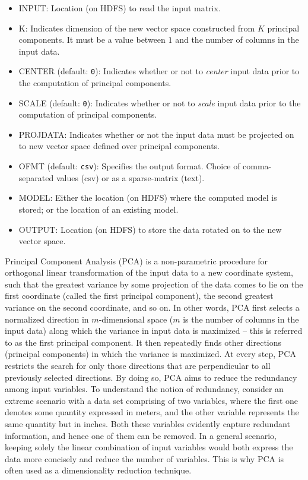 
\begin{itemize}
\item INPUT: Location (on HDFS) to read the input matrix.
\item K: Indicates dimension of the new vector space constructed from $K$ principal components. It must be a value between $1$ and the number of columns in the input data.
\item CENTER (default: {\tt 0}): Indicates whether or not to {\em center} input data prior to the computation of principal components.
\item SCALE (default: {\tt 0}): Indicates whether or not to {\em scale} input data prior to the computation of principal components.
\item PROJDATA: Indicates whether or not the input data must be projected on to new vector space defined over principal components.
\item OFMT (default: {\tt csv}): Specifies the output format. Choice of comma-separated values (csv) or as a sparse-matrix (text).
\item MODEL: Either the location (on HDFS) where the computed model is stored; or the location of an existing model.
\item OUTPUT: Location (on HDFS) to store the data rotated on to the new vector space.
\end{itemize}


Principal Component Analysis (PCA) is a non-parametric procedure for orthogonal linear transformation of the input data to a new coordinate system, such that the greatest variance by some projection of the data comes to lie on the first coordinate (called the first principal component), the second greatest variance on the second coordinate, and so on. In other words, PCA first selects a normalized direction in $m$-dimensional space ($m$ is the number of columns in the input data) along which the variance in input data is maximized -- this is referred to as the first principal component. It then repeatedly finds other directions (principal components) in which the variance is maximized. At every step, PCA restricts the search for only those directions that are perpendicular to all previously selected directions. By doing so, PCA aims to reduce the redundancy among input variables. To understand the notion of redundancy, consider an extreme scenario with a data set comprising of two variables, where the first one denotes some quantity expressed in meters, and the other variable represents the same quantity but in inches. Both these variables evidently capture redundant information, and hence one of them can be removed. In a general scenario, keeping solely the linear combination of input variables would both express the data more concisely and reduce the number of variables. This is why PCA is often used as a dimensionality reduction technique.

